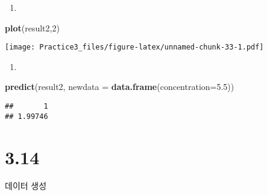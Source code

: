 \documentclass[
]{article}
\newenvironment{Shaded}{\begin{snugshade}}{\end{snugshade}}
\newcommand{\DataTypeTok}[1]{\textcolor[rgb]{0.13,0.29,0.53}{#1}}
\newcommand{\DecValTok}[1]{\textcolor[rgb]{0.00,0.00,0.81}{#1}}
\newcommand{\FloatTok}[1]{\textcolor[rgb]{0.00,0.00,0.81}{#1}}
\newcommand{\KeywordTok}[1]{\textcolor[rgb]{0.13,0.29,0.53}{\textbf{#1}}}
\newcommand{\NormalTok}[1]{#1}
\begin{document}
\begin{enumerate}
\def\labelenumi{(\alph{enumi})}
\setcounter{enumi}{9}
\item
\end{enumerate}

\begin{Shaded}
\begin{Highlighting}[]
\KeywordTok{plot}\NormalTok{(result2,}\DecValTok{2}\NormalTok{)}
\end{Highlighting}
\end{Shaded}

\texttt{[image: Practice3\_files/figure-latex/unnamed-chunk-33-1.pdf]}

\begin{enumerate}
\def\labelenumi{(\alph{enumi})}
\setcounter{enumi}{10}
\item
\end{enumerate}

\begin{Shaded}
\begin{Highlighting}[]
\KeywordTok{predict}\NormalTok{(result2, }\DataTypeTok{newdata =} \KeywordTok{data.frame}\NormalTok{(}\DataTypeTok{concentration=}\FloatTok{5.5}\NormalTok{))}
\end{Highlighting}
\end{Shaded}

\begin{verbatim}
##       1 
## 1.99746
\end{verbatim}

\hypertarget{section-2}{%
\section{3.14}\label{section-2}}

데이터 생성
\end{document}
